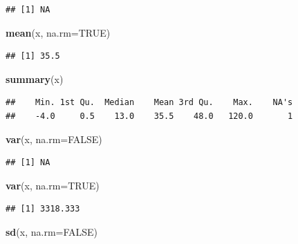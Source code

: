\documentclass[
]{book}
\newenvironment{Shaded}{\begin{snugshade}}{\end{snugshade}}
\newcommand{\AttributeTok}[1]{\textcolor[rgb]{0.13,0.29,0.53}{#1}}
\newcommand{\ConstantTok}[1]{\textcolor[rgb]{0.56,0.35,0.01}{#1}}
\newcommand{\FunctionTok}[1]{\textcolor[rgb]{0.13,0.29,0.53}{\textbf{#1}}}
\newcommand{\NormalTok}[1]{#1}
\begin{document}
\begin{verbatim}
## [1] NA
\end{verbatim}

\begin{Shaded}
\begin{Highlighting}[]
\FunctionTok{mean}\NormalTok{(x, }\AttributeTok{na.rm=}\ConstantTok{TRUE}\NormalTok{)}
\end{Highlighting}
\end{Shaded}

\begin{verbatim}
## [1] 35.5
\end{verbatim}

\begin{Shaded}
\begin{Highlighting}[]
\FunctionTok{summary}\NormalTok{(x)}
\end{Highlighting}
\end{Shaded}

\begin{verbatim}
##    Min. 1st Qu.  Median    Mean 3rd Qu.    Max.    NA's 
##    -4.0     0.5    13.0    35.5    48.0   120.0       1
\end{verbatim}

\begin{Shaded}
\begin{Highlighting}[]
\FunctionTok{var}\NormalTok{(x, }\AttributeTok{na.rm=}\ConstantTok{FALSE}\NormalTok{)}
\end{Highlighting}
\end{Shaded}

\begin{verbatim}
## [1] NA
\end{verbatim}

\begin{Shaded}
\begin{Highlighting}[]
\FunctionTok{var}\NormalTok{(x, }\AttributeTok{na.rm=}\ConstantTok{TRUE}\NormalTok{)}
\end{Highlighting}
\end{Shaded}

\begin{verbatim}
## [1] 3318.333
\end{verbatim}

\begin{Shaded}
\begin{Highlighting}[]
\FunctionTok{sd}\NormalTok{(x, }\AttributeTok{na.rm=}\ConstantTok{FALSE}\NormalTok{)}
\end{Highlighting}
\end{Shaded}
\end{document}

